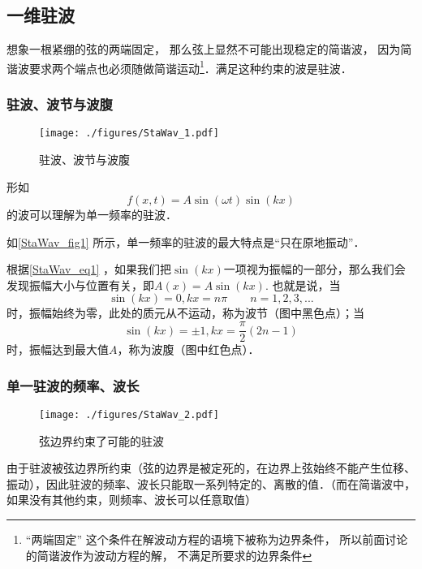 
\begin{issues}
\issueDraft
\end{issues}


\subsection{一维驻波}
想象一根紧绷的弦的两端固定， 那么弦上显然不可能出现稳定的简谐波， 因为简谐波要求两个端点也必须随做简谐运动\footnote{“两端固定” 这个条件在解波动方程的语境下被称为边界条件， 所以前面讨论的简谐波作为波动方程的解， 不满足所要求的边界条件}．满足这种约束的波是驻波．

\subsubsection{驻波、波节与波腹}
\begin{figure}[ht]
\centering
\texttt{[image: ./figures/StaWav\_1.pdf]}
\caption{驻波、波节与波腹} \label{StaWav_fig1}
\end{figure}

形如
\begin{equation}\label{StaWav_eq1}
f(x,t)=A\sin(\omega t)\sin(kx)
\end{equation}
的波可以理解为单一频率的驻波．

如\autoref{StaWav_fig1} 所示，单一频率的驻波的最大特点是“只在原地振动”．

根据\autoref{StaWav_eq1} ，如果我们把$\sin(kx)$一项视为振幅的一部分，那么我们会发现振幅大小与位置有关，即$A(x) = A \sin(kx)$. 也就是说，当$$\sin(kx)=0, kx=n\pi \qquad n=1,2,3,...$$时，振幅始终为零，此处的质元从不运动，称为波节（图中黑色点）；当$$\sin(kx)=\pm1, kx=\frac{\pi}{2} (2n-1)$$时，振幅达到最大值$A$，称为波腹（图中红色点）．

\subsubsection{单一驻波的频率、波长}
\begin{figure}[ht]
\centering
\texttt{[image: ./figures/StaWav\_2.pdf]}
\caption{弦边界约束了可能的驻波} \label{StaWav_fig2}
\end{figure}

由于驻波被弦边界所约束（弦的边界是被定死的，在边界上弦始终不能产生位移、振动），因此驻波的频率、波长只能取一系列特定的、离散的值．（而在简谐波中，如果没有其他约束，则频率、波长可以任意取值）

